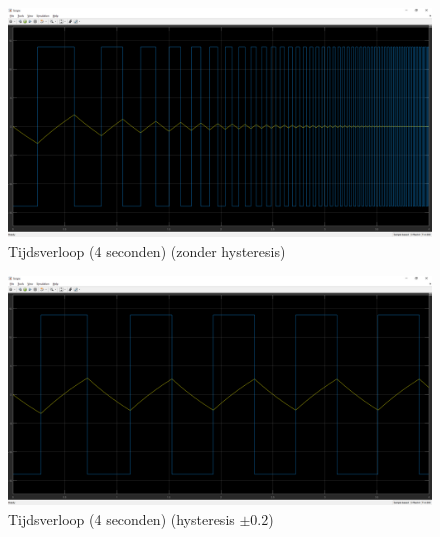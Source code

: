 \documentclass[12pt]{article}
\begin{document}
\begin{figure}[!h]
	\centering
	\includegraphics[width=\textwidth, keepaspectratio]{tijdnohysopgave2.png}
	\caption{Tijdsverloop (4 seconden) (zonder hysteresis)}
	\label{tijdnohysopgave2}
\end{figure}
\begin{figure}[!h]
	\centering
	\includegraphics[width=\textwidth, keepaspectratio]{tijdhysopgave2.png}
	\caption{Tijdsverloop (4 seconden) (hysteresis $\pm 0.2$)}
	\label{tijdhysopgave2}
\end{figure}
\clearpage
\end{document}
